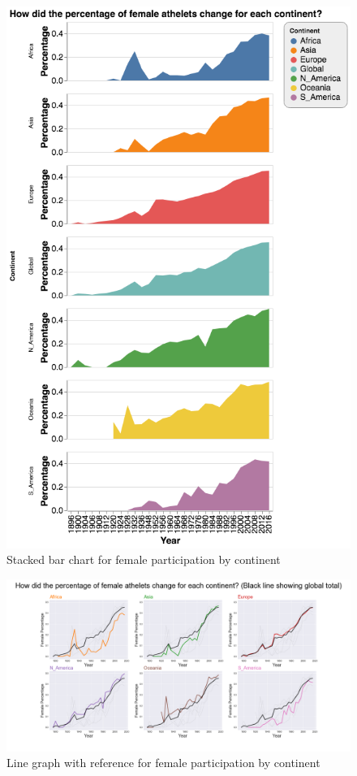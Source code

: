 \documentclass[12pt]{article}
\begin{document}
\begin{figure}
    \centering
    \includegraphics[scale=0.35]{pics/g-2-4_new.png}
    \caption{Stacked bar chart for female participation by continent}
    \label{fig:my_label}
\end{figure}

\begin{figure}
    \centering
    \includegraphics[angle=270, scale=0.44]{pics/g-2-6_new.png}
    \caption[angle=270]{Line graph with reference for female participation by continent}
    \label{fig:my_label}
\end{figure}
\end{document}
